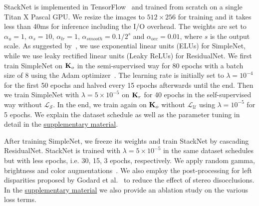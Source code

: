 \documentclass[runningheads]{llncs}
\begin{document}
StackNet is implemented in 
TensorFlow~\cite{abadi2016tensorflow} and 
trained from scratch on a single Titan X 
Pascal GPU. 
We resize the images to $512 \times 
256$ for training and it takes less than 40ms 
for inference including the I/O overhead. The 
weights are set to $\alpha_u = 1$, $\alpha_s 
= 10$, $\alpha_{lr} = 1$, $\alpha_{smooth} = 
0.1/2^s$ and $\alpha_{occ} = 0.01$, where $s$ 
is the output scale. As suggested 
by~\cite{godard2016unsupervised}, we 
use exponential linear units (ELUs) 
for SimpleNet, while we use leaky 
rectified linear units (Leaky ReLUs) for ResidualNet. We 
first train SimpleNet on $\text{\textbf{K}}_o$ in 
the semi-supervised way for 80 epochs 
with a batch size of 8 using the Adam 
optimizer~\cite{kingma2014adam}. The 
learning rate is initially set to 
$\lambda = 10^{-4}$ for the first 50 epochs 
and halved every 15 epochs 
afterwards until the end. Then we train SimpleNet with $\lambda = 5 \times 
10^{-5}$ on $\text{\textbf{K}}_r$ for 40 
epochs in the self-supervised way without 
$\mathcal{L_S}$. In the end, we 
train again on 
$\text{\textbf{K}}_o$ without $\mathcal{L_U}$ using $\lambda = 10^{-5}$ for 5 
epochs. We explain the dataset schedule as well as the parameter 
tuning in detail in the 
\href{https://vision.in.tum.de/_media/spezial/bib/yang2018dvso-supp.pdf}{supplementary
	material}.

After training SimpleNet, we freeze 
its weights and train StackNet by cascading 
ResidualNet. StackNet is trained with 
$\lambda = 5 \times 
10^{-5}$ in the same dataset 
schedules but with less epochs, i.e. 30, 15, 3 
epochs, respectively. We apply random gamma, brightness and color 
augmentations~\cite{godard2016unsupervised}. We 
also employ the post-processing for left disparities proposed by Godard et 
al.~\cite{godard2016unsupervised} to reduce the effect of stereo disocclusions.
In the 
\href{https://vision.in.tum.de/_media/spezial/bib/yang2018dvso-supp.pdf}{supplementary
	material} we also provide an ablation study on the various loss terms.
\end{document}
